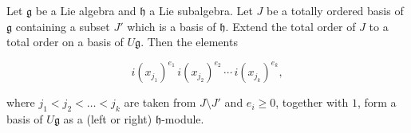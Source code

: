 Let $\mathfrak{g}$ be a Lie algebra and $\mathfrak{h}$ a Lie subalgebra. Let $J$ be a totally ordered basis of $\mathfrak{g}$ containing a subset $J'$ which is a basis of $\mathfrak{h}$. Extend the total order of $J$ to a total order on a basis of $U\mathfrak{g}$. Then the elements

$$i(x_{j_1})^{e_1} \, i(x_{j_2})^{e_2} \, \cdots \, i(x_{j_k})^{e_k},$$

where $j_1 < j_2 < \dots < j_k$ are taken from $J \setminus J'$ and $e_i \geq 0$, together with $1$, form a basis of $U\mathfrak{g}$ as a (left or right) $\mathfrak{h}$-module.
